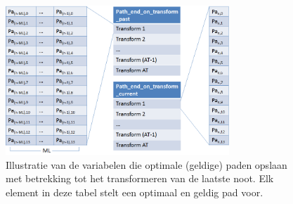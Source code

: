 \begin{figure}[!ht]
  \centering
  \includegraphics[width=0.75\textwidth]{4_Efficient_Toepassen_Transformatie/path_transform_algo_2}
  \caption{Illustratie van de variabelen die optimale (geldige) paden opslaan met betrekking tot het transformeren van de laatste noot. Elk element in deze tabel stelt een optimaal en geldig pad voor.}
  \label{figuur:path_transform_algo_2}
\end{figure}

